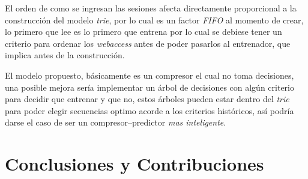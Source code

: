 



 


 


 

El orden de como se ingresan las sesiones afecta directamente proporcional a la construcción del modelo \emph{trie},  por lo cual es un factor  \emph{FIFO} al momento de crear, lo primero que lee es lo primero que entrena por lo cual se debiese tener un criterio para ordenar los \emph{webaccess} antes de poder pasarlos al entrenador, que implica antes de la construcción.

El modelo propuesto, básicamente es un compresor el cual no toma decisiones, una posible mejora sería implementar un árbol de decisiones con algún criterio para decidir que entrenar y que no, estos árboles pueden estar dentro del \emph{trie} para
poder elegir secuencias optimo acorde a los criterios históricos, así podría darse el caso de ser un compresor--predictor  \emph{mas inteligente}.










\newpage
\section{Conclusiones y Contribuciones}\label{ch:conlusion-contrib-all}





















 








